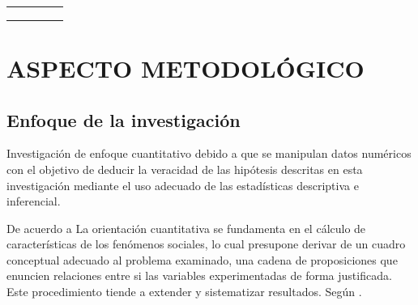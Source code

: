 \documentclass[12pt,a4paper]{article}
\begin{document}
\begin{table}[ht!]
\begin{tabular}{cllcc}
		                    &                                                   & \multirow{1}{*}{\fbbbbbbbbbbbbb}   &                                                                              &                                                                \\\cline{3-3}
		                    &                                                   & \multirow{1}{*}{\fbbbbbbbbbbbbbb}  &                                                                              &                                                                \\\cline{3-3}
		                    &                                                   & \multirow{1}{*}{\fbbbbbbbbbbbbbbb} &                                                                              &                                                                \\\bottomrule%
	\end{tabular}
\vspace{0.5cm}
\end{table}


\section{ASPECTO METODOLÓGICO}

\subsection{Enfoque de la investigación}
Investigación de enfoque cuantitativo debido a que se manipulan datos numéricos con el objetivo de deducir la veracidad de las hipótesis descritas en esta investigación mediante el uso adecuado de las estadísticas descriptiva e inferencial.

De acuerdo a \cite{alzina_metodologiinvestigacion_2004} La orientación cuantitativa se fundamenta en el cálculo de características de los fenómenos sociales, lo cual presupone derivar de un cuadro conceptual adecuado al problema examinado, una cadena de proposiciones que enuncien relaciones entre si las variables experimentadas de forma justificada. Este procedimiento tiende a extender y sistematizar resultados. Según \cite{hernandez_sampieri_metodologiinvestigacion_2014}.
\end{document}
